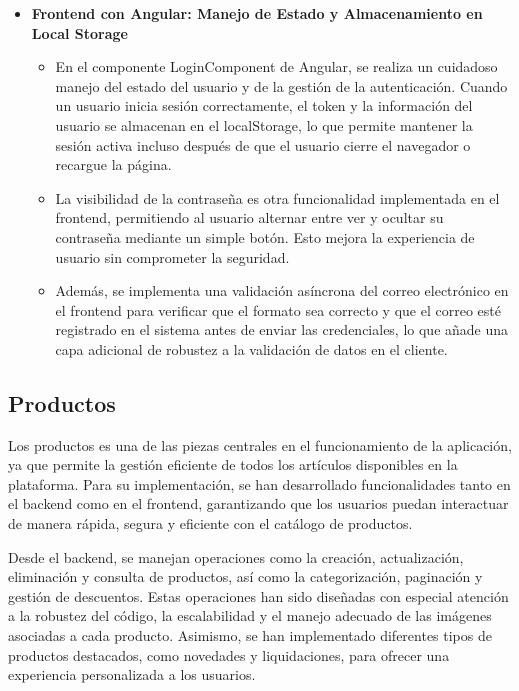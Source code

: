 \begin{itemize}
    \item \textbf{Frontend con Angular: Manejo de Estado y Almacenamiento en Local Storage} 

        \begin{itemize}
        \item En el componente LoginComponent de Angular, se realiza un cuidadoso manejo del estado del usuario y de la gestión de la autenticación. Cuando un usuario inicia sesión correctamente, el token y la información del usuario se almacenan en el localStorage, lo que permite mantener la sesión activa incluso después de que el usuario cierre el navegador o recargue la página.
        
        
        \item La visibilidad de la contraseña es otra funcionalidad implementada en el frontend, permitiendo al usuario alternar entre ver y ocultar su contraseña mediante un simple botón. Esto mejora la experiencia de usuario sin comprometer la seguridad.

        \item Además, se implementa una validación asíncrona del correo electrónico en el frontend para verificar que el formato sea correcto y que el correo esté registrado en el sistema antes de enviar las credenciales, lo que añade una capa adicional de robustez a la validación de datos en el cliente.
        
    \end{itemize}

    \vspace{0.5cm}

\end{itemize}

\subsection{Productos}\label{subsec5.4.2}

Los productos es una de las piezas centrales en el funcionamiento de la aplicación, ya que permite la gestión eficiente de todos los artículos disponibles en la plataforma. Para su implementación, se han desarrollado funcionalidades tanto en el backend como en el frontend, garantizando que los usuarios puedan interactuar de manera rápida, segura y eficiente con el catálogo de productos.

\vspace{0.5cm}

Desde el backend, se manejan operaciones como la creación, actualización, eliminación y consulta de productos, así como la categorización, paginación y gestión de descuentos. Estas operaciones han sido diseñadas con especial atención a la robustez del código, la escalabilidad y el manejo adecuado de las imágenes asociadas a cada producto. Asimismo, se han implementado diferentes tipos de productos destacados, como novedades y liquidaciones, para ofrecer una experiencia personalizada a los usuarios.

